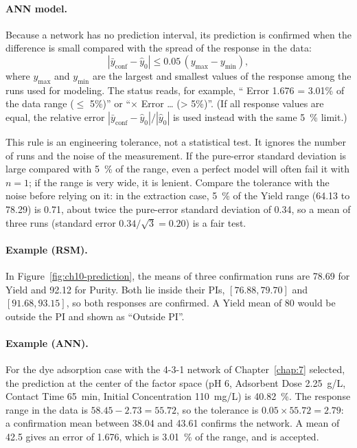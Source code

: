 \paragraph{ANN model.} Because a network has no prediction interval, its prediction is confirmed when the
difference is small compared with the spread of the response in the data:
\begin{equation}
  \left|\bar y_\text{conf} - \hat y_0\right| \le 0.05\,\left(y_\text{max} - y_\text{min}\right),
  \label{eq:ch10-rule-ann}
\end{equation}
where $y_\text{max}$ and $y_\text{min}$ are the largest and smallest values of the response among the runs used for
modeling. The status reads, for example, ``\checkmark{} Error 1.676 = 3.01\% of the data range ($\le$ 5\%)''
or ``$\times$ Error \dots{} (> 5\%)''. (If all response values are equal, the relative error $|\bar y_\text{conf} -
\hat y_0|/|\hat y_0|$ is used instead with the same 5~\% limit.)

This rule is an engineering tolerance, not a statistical test. It ignores the number of runs and the noise of the
measurement. If the pure-error standard deviation is large compared with 5~\% of the range, even a perfect model
will often fail it with $n = 1$; if the range is very wide, it is lenient. Compare the tolerance with the noise
before relying on it: in the extraction case, 5~\% of the Yield range (64.13 to 78.29) is 0.71, about twice the
pure-error standard deviation of 0.34, so a mean of three runs (standard error $0.34/\sqrt3 = 0.20$) is a fair test.

\paragraph{Example (RSM).} In Figure~\ref{fig:ch10-prediction}, the means of three confirmation runs are 78.69 for
Yield and 92.12 for Purity. Both lie inside their PIs, $[76.88, 79.70]$ and $[91.68, 93.15]$, so both responses are
confirmed. A Yield mean of 80 would be outside the PI and shown as ``Outside PI''.

\paragraph{Example (ANN).} For the dye adsorption case with the 4-3-1 network of Chapter~\ref{chap:7} selected, the
prediction at the center of the factor space (pH 6, Adsorbent Dose 2.25~g/L, Contact Time 65~min, Initial
Concentration 110~mg/L) is 40.82~\%. The response range in the data is $58.45 - 2.73 = 55.72$, so the tolerance is
$0.05 \times 55.72 = 2.79$: a confirmation mean between 38.04 and 43.61 confirms the network. A mean of 42.5 gives
an error of 1.676, which is 3.01~\% of the range, and is accepted.

